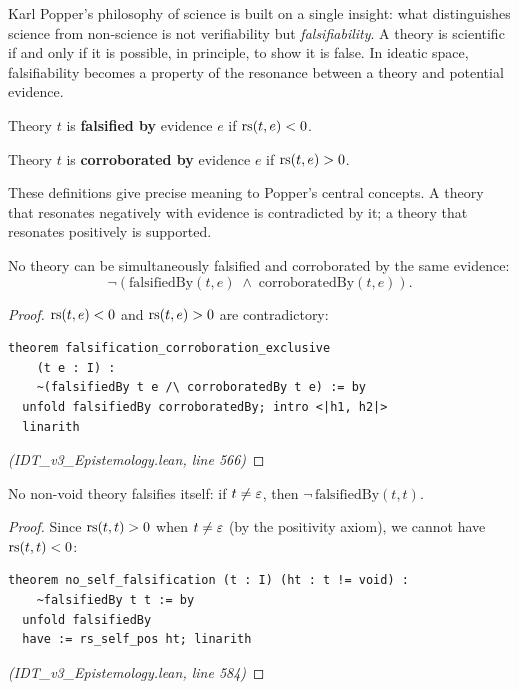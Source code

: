 Karl Popper's philosophy of science is built on a single insight: what
distinguishes science from non-science is not verifiability but
\emph{falsifiability}. A theory is scientific if and only if it is possible, in
principle, to show it is false. In ideatic space, falsifiability becomes a
property of the resonance between a theory and potential evidence.

\begin{definition}[Falsification]
\label{def:falsification}
Theory $t$ is \textbf{falsified by} evidence $e$ if $\mathrm{rs}(t, e) < 0$.
\end{definition}

\begin{definition}[Corroboration]
\label{def:corroboration}
Theory $t$ is \textbf{corroborated by} evidence $e$ if $\mathrm{rs}(t, e) > 0$.
\end{definition}

These definitions give precise meaning to Popper's central concepts. A theory
that resonates negatively with evidence is contradicted by it; a theory that
resonates positively is supported.

\begin{theorem}
\label{thm:falsif-corr-exclusive}
No theory can be simultaneously falsified and corroborated by the same evidence:
\[
  \neg(\mathrm{falsifiedBy}(t, e) \;\wedge\; \mathrm{corroboratedBy}(t, e)).
\]
\end{theorem}

\begin{proof}
$\mathrm{rs}(t,e) < 0$ and $\mathrm{rs}(t,e) > 0$ are contradictory:
\begin{lstlisting}
theorem falsification_corroboration_exclusive
    (t e : I) :
    ~(falsifiedBy t e /\ corroboratedBy t e) := by
  unfold falsifiedBy corroboratedBy; intro <|h1, h2|>
  linarith
\end{lstlisting}
\textit{(IDT\_v3\_Epistemology.lean, line 566)}
\end{proof}

\begin{theorem}
\label{thm:no-self-falsification}
No non-void theory falsifies itself: if $t \neq \varepsilon$, then $\neg\,\mathrm{falsifiedBy}(t, t)$.
\end{theorem}

\begin{proof}
Since $\mathrm{rs}(t,t) > 0$ when $t \neq \varepsilon$ (by the positivity axiom), we cannot
have $\mathrm{rs}(t,t) < 0$:
\begin{lstlisting}
theorem no_self_falsification (t : I) (ht : t != void) :
    ~falsifiedBy t t := by
  unfold falsifiedBy
  have := rs_self_pos ht; linarith
\end{lstlisting}
\textit{(IDT\_v3\_Epistemology.lean, line 584)}
\end{proof}

